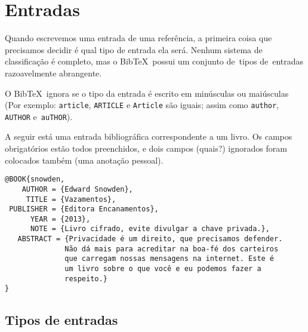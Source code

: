 \documentclass[article,openany]{memoir}
\begin{document}
\chapter{Entradas}

Quando escrevemos uma entrada de uma referência, a primeira coisa que
precisamos decidir é qual tipo de entrada ela será. Nenhum sistema de
classificação é completo, mas o Bib\TeX\ possui um conjunto de~tipos
de~entradas razoavelmente abrangente.



O Bib\TeX\ ignora se o tipo da entrada é escrito em minúsculas ou
maiúsculas (Por exemplo: \verb/article/, \verb/ARTICLE/
e \verb/Article/ são iguais; assim como \verb/author/, \verb/AUTHOR/
e~\verb/auTHOR/).

A seguir está uma entrada bibliográfica correspondente a um livro. Os
campos obrigatórios estão todos preenchidos, e dois campos (quais?)
ignorados foram colocados também (uma anotação pessoal).

\begin{verbatim}
@BOOK{snowden,
    AUTHOR = {Edward Snowden},
     TITLE = {Vazamentos},
 PUBLISHER = {Editora Encanamentos},
      YEAR = {2013},
      NOTE = {Livro cifrado, evite divulgar a chave privada.},
   ABSTRACT = {Privacidade é um direito, que precisamos defender.
              Não dá mais para acreditar na boa-fé dos carteiros
              que carregam nossas mensagens na internet. Este é
              um livro sobre o que você e eu podemos fazer a 
              respeito.}
}

\end{verbatim}

\section{Tipos de entradas}
\end{document}
